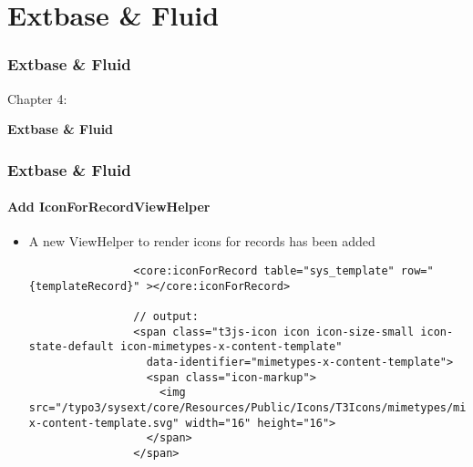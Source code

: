 %

\section{Extbase \& Fluid}
\begin{frame}[fragile]
	\frametitle{Extbase \& Fluid}

	\begin{center}\huge{Chapter 4:}\end{center}
	\begin{center}\huge{\color{typo3darkgrey}\textbf{Extbase \& Fluid}}\end{center}

\end{frame}

\begin{frame}[fragile]
	\frametitle{Extbase \& Fluid}
	\framesubtitle{Add IconForRecordViewHelper}

	\lstset{basicstyle=\tiny\ttfamily}

	\begin{itemize}

		\item A new ViewHelper to render icons for records has been added

			\begin{lstlisting}
				<core:iconForRecord table="sys_template" row="{templateRecord}" ></core:iconForRecord>

				// output:
				<span class="t3js-icon icon icon-size-small icon-state-default icon-mimetypes-x-content-template"
				  data-identifier="mimetypes-x-content-template">
				  <span class="icon-markup">
				    <img src="/typo3/sysext/core/Resources/Public/Icons/T3Icons/mimetypes/mimetypes-x-content-template.svg" width="16" height="16">
				  </span>
				</span>
			\end{lstlisting}

	\end{itemize}

\end{frame}

